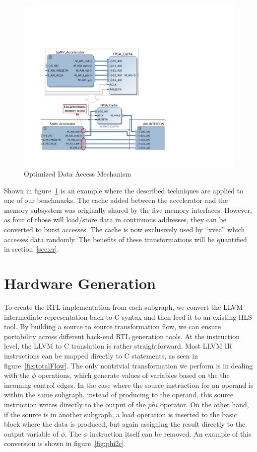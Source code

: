 \begin{figure}[htp]
\begin{center}
\includegraphics[width=0.65\linewidth]{chap3fig/memOptConv.pdf}
\caption{Optimized Data Access Mechanism
\label{fig:from2}}
\end{center}
\end{figure}
Shown in figure~\ref{fig:from2} is an example where the described techniques are applied to one of our benchmarks.
The cache added between the accelerator and the memory subsystem was originally shared by the five memory
interfaces. However,
as four of those will load/store data in continuous addresses, they can be converted to burst accesses.
The cache is now exclusively used by ``xvec'' which accesses data randomly. The benefits of these transformations
will be quantified in section~\ref{sec:er}.


\section{Hardware Generation}

To create the RTL implementation from each subgraph,
we convert the LLVM intermediate representation back to C
syntax and then feed it to an existing HLS tool. By building a
source to source transformation flow, we can ensure portability
across different back-end RTL generation tools.
At the instruction level, the LLVM to C translation is rather
straightforward. Most LLVM IR instructions can be mapped
directly to C statements, as seen in figure~\ref{fig:totalFlow}. The only nontrivial
transformation we perform is in dealing with the $\phi$ operations, which generate
 values of variables based on the the incoming control edges.  In the case where the source instruction for an operand is within the same subgraph, instead of
 producing to the operand, this source instruction writes directly to the output
 of the $phi$ operator.
 On the other hand, if the source
is in another subgraph, a load operation is inserted to the basic block
where the data is produced, but again assigning the result directly
to the output variable of $\phi$. The $\phi$
instruction itself can be removed. An example of this conversion is
shown in figure~\ref{fig:phi2c}.


